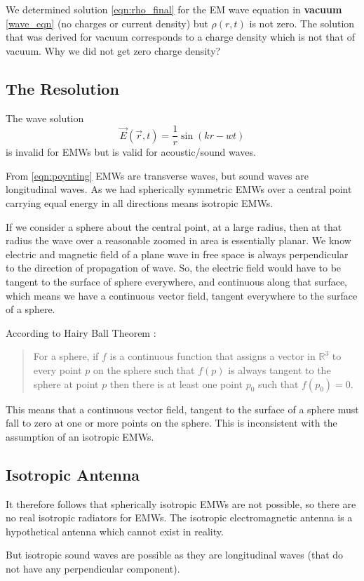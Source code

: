 We determined solution \eqref{eqn:rho_final} for the EM wave equation in \textbf{vacuum} \eqref{wave_eqn} (no charges or current density) but $\rho(r,t)$ is not zero. The solution that was derived for vacuum corresponds to a charge density which is not that of vacuum. Why we did not get zero charge density?

\subsection{The Resolution}

The wave solution
%
   \begin{equation}
      \vec{E}(\vec{r},t) = \frac{1}{r}\sin(kr-wt)
   \end{equation}
%
is invalid for EMWs but is valid for acoustic/sound waves.

From \eqref{eqn:poynting} EMWs are transverse waves, but sound waves are longitudinal waves. As we had spherically symmetric EMWs over a central point carrying equal energy in all directions means isotropic EMWs.

If we consider a sphere about the central point, at a large radius, then at that radius the wave over a reasonable zoomed in area is essentially planar. We know electric and magnetic field of a plane wave in free space is always perpendicular to the direction of propagation of wave. So, the electric field would have to be tangent to the surface of sphere everywhere, and continuous along that surface, which means we have a continuous vector field, tangent everywhere to the surface of a sphere.

According to Hairy Ball Theorem \cite{milnor1978analytic}:
%
\begin{quote}
   For a sphere, if $f$ is a continuous function that assigns a vector in $\mathbb{R}^3$ to every point $p$ on the sphere such that $f(p)$ is always tangent to the sphere at point $p$ then there is at least one point $p_0$ such that $f(p_0) = 0$.
\end{quote}

This means that a continuous vector field, tangent to the surface of a sphere must fall to zero at one or more points on the sphere. This is inconsistent with the assumption of an isotropic EMWs.

\subsection{Isotropic Antenna}

It therefore follows that spherically isotropic EMWs are not possible, so there are no real isotropic radiators for EMWs. The isotropic electromagnetic antenna is a hypothetical antenna which cannot exist in reality.

But isotropic sound waves are possible as they are longitudinal waves (that do not have any perpendicular component).
